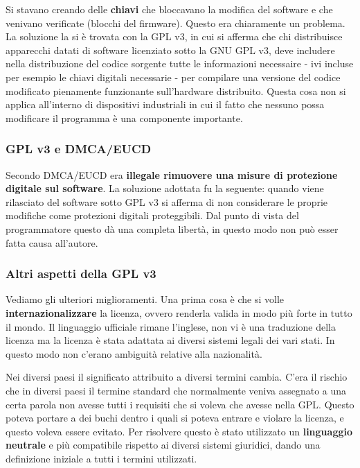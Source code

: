 Si stavano creando delle \textbf{chiavi} che bloccavano la modifica del software e che venivano verificate (blocchi del firmware). Questo era chiaramente un problema. La soluzione la si è trovata con la GPL v3, in cui si afferma che chi distribuisce apparecchi datati di software licenziato sotto la GNU GPL v3, deve includere nella distribuzione del codice sorgente tutte le informazioni necessaire - ivi incluse per esempio le chiavi digitali necessarie - per compilare una versione del codice modificato pienamente funzionante sull'hardware distribuito. Questa cosa non si applica all'interno di dispositivi industriali in cui il fatto che nessuno possa modificare il programma è una componente importante.

\subsubsection{GPL v3 e DMCA/EUCD}

Secondo DMCA/EUCD era \textbf{illegale rimuovere una misure di protezione digitale sul software}. La soluzione adottata fu la seguente: quando viene rilasciato del software sotto GPL v3 si afferma di non considerare le proprie modifiche come protezioni digitali proteggibili. Dal punto di vista del programmatore questo dà una completa libertà, in questo modo non può esser fatta causa all'autore.


\subsubsection{Altri aspetti della GPL v3}

Vediamo gli ulteriori miglioramenti. Una prima cosa è che si volle \textbf{internazionalizzare} la licenza, ovvero renderla valida in modo più forte in tutto il mondo. Il linguaggio ufficiale rimane l'inglese, non vi è una traduzione della licenza ma la licenza è stata adattata ai diversi sistemi legali dei vari stati. In questo modo non c'erano ambiguità relative alla nazionalità. 

Nei diversi paesi il significato attribuito a diversi termini cambia. C'era il rischio che in diversi paesi il termine standard che normalmente veniva assegnato a una certa parola non avesse tutti i requisiti che si voleva che avesse nella GPL. Questo poteva portare a dei buchi dentro i quali si poteva entrare e violare la licenza, e questo voleva essere evitato. Per risolvere questo è stato utilizzato un \textbf{linguaggio neutrale} e più compatibile rispetto ai diversi sistemi giuridici, dando una definizione iniziale a tutti i termini utilizzati.

